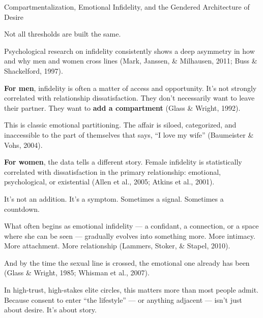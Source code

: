 \begin{PsychologicalSidebar}{Compartmentalization, Emotional Infidelity, and the Gendered Architecture of Desire}

  Not all thresholds are built the same.

  \medskip
  
  Psychological research on infidelity consistently shows a deep asymmetry in how and why men and women 
  cross lines (Mark, Janssen, \& Milhausen, 2011; Buss \& Shackelford, 1997).
  
  \medskip
  
  \textbf{For men}, infidelity is often a matter of access and opportunity. It’s not strongly correlated 
  with relationship dissatisfaction.  
  They don’t necessarily want to leave their partner. They want to \textbf{add a compartment} 
  (Glass \& Wright, 1992).

  \medskip
  
  This is classic emotional partitioning. The affair is siloed, categorized, and
  inaccessible to the part of themselves that says, ``I love my wife'' (Baumeister \& Vohs, 2004).
  
  \medskip
  
  \textbf{For women}, the data tells a different story.  
  Female infidelity is statistically correlated with dissatisfaction in the primary relationship:
  emotional, psychological, or existential (Allen et al., 2005; Atkins et al., 2001).  

  \medskip
  
  It’s not an addition. It’s a symptom.  
  Sometimes a signal.  
  Sometimes a countdown.
  
  \medskip
  
  What often begins as emotional infidelity --- a confidant, a connection, or a space where she can be seen
  --- gradually evolves into something more.  
  More intimacy. More attachment.  
  More relationship (Lammers, Stoker, \& Stapel, 2010).

  \medskip
  
  And by the time the sexual line is crossed, the emotional one already has been 
  (Glass \& Wright, 1985; Whisman et al., 2007).
  
  \medskip
  
  In high-trust, high-stakes elite circles, this matters more than most people admit.  
  Because consent to enter “the lifestyle” --- or anything adjacent --- isn’t just about desire.  
  It’s about story.
  
  \medskip
  

\end{PsychologicalSidebar}
